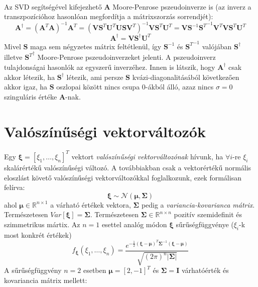 \documentclass[14p]{report}
\def\pmb{\boldsymbol}
\newcounter{x}
\newcounter{y}
\newcounter{z}
\begin{document}
	\\
	Az SVD segítségével kifejezhető $\pmb{A}$ Moore-Penrose pszeudoinverze is (az inverz a transzpozícióhoz hasonlóan megfordítja a mátrixszorzás sorrendjét):
	\[
		\pmb{A}^{\dagger} = (\pmb{A}^T\pmb{A})^{-1}\pmb{A}^T = (\pmb{V}\pmb{S}^T\pmb{U}^T\pmb{U}\pmb{S}\pmb{V}^T)^{-1}\pmb{V}\pmb{S}^T\pmb{U}^T = \pmb{V}\pmb{S}^{-1}{\pmb{S}^T}^{-1}\pmb{V}^T\pmb{V}\pmb{S}^T\pmb{U}^T
	\]
	\[
		\pmb{A}^{\dagger} = \pmb{V}\pmb{S}^{\dagger}\pmb{U}^T
	\]
	Mivel $\pmb{S}$ maga sem négyzetes mátrix feltétlenül, így $\pmb{S}^{-1}$ és ${\pmb{S}^T}^{-1}$ valójában $\pmb{S}^{\dagger}$ illetve ${\pmb{S}^T}^{\dagger}$ Moore-Penrose pszeudoinverzeket jelenti. A pszeudoinverz tulajdonságai hasonlók az egyszerű inverzéhez.
	Innen is látszik, hogy $\pmb{A}^{\dagger}$ csak akkor létezik, ha $\pmb{S}^{\dagger}$ létezik, ami persze $\pmb{S}$ kvázi-diagonalitásából következően akkor igaz, ha $\pmb{S}$ oszlopai között nincs csupa $0$-ákból álló, azaz nincs $\sigma = 0$ szinguláris értéke $\pmb{A}$-nak.
	
	\section{Valószínűségi vektorváltozók}
	Egy $\pmb{\xi} = [\xi_1, \dots , \xi_n]^T$ vektort \emph{valószínűségi vektorváltozónak} hívunk, ha $\forall i$-re $\xi_i$ skalárértékű valószínűségi változó. A továbbiakban csak a vektorértékű normális eloszlást követő valószínűségi vektorváltozókkal foglalkozunk, ezek formálisan felírva:
	\[
	\pmb{\xi} \sim \mathcal{N}(\pmb{\mu}, \pmb{\Sigma})
	\]
	ahol $\pmb{\mu} \in \mathbb{R}^{n \times 1}$ a várható értékek vektora, $\pmb{\Sigma}$ pedig a \emph{variancia-kovarianca mátrix}. Természetesen $Var[\pmb{\xi}] = \pmb{\Sigma}$. Természetesen $\pmb{\Sigma} \in \mathbb{R}^{n \times n}$ pozitív szemidefinit és szimmetrikus mártix. Az $n = 1$ esettel analóg módon $\pmb{\xi}$ sűrűségfüggvénye ($\xi_i$-k most konkrét értékek)
	\[
	f_{\pmb{\xi}}(\xi_1, \dots, \xi_n) = \frac{ e^{-\frac{1}{2}(\pmb{\xi}-\pmb{\mu})^T\pmb{\Sigma}^{-1}(\pmb{\xi}-\pmb{\mu})}}{\sqrt{(2\pi)^n|\pmb{\Sigma}|}}
	\]
	A sűrűségfüggvény $n = 2$ esetben $\pmb{\mu} = [2, -1]^T$ és $\pmb{\Sigma} = \pmb{I}$ várhatóérték és kovariancia mátrix mellett: 
	\def\centerx{2}
	\def\centery{-1}
	
\end{document}
